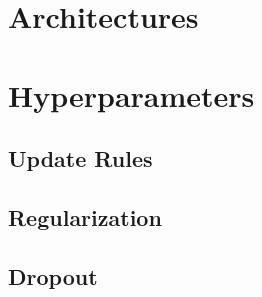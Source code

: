\section{Architectures}

\section{Hyperparameters}
\subsection{Update Rules}

\subsection{Regularization}

\subsection{Dropout}


